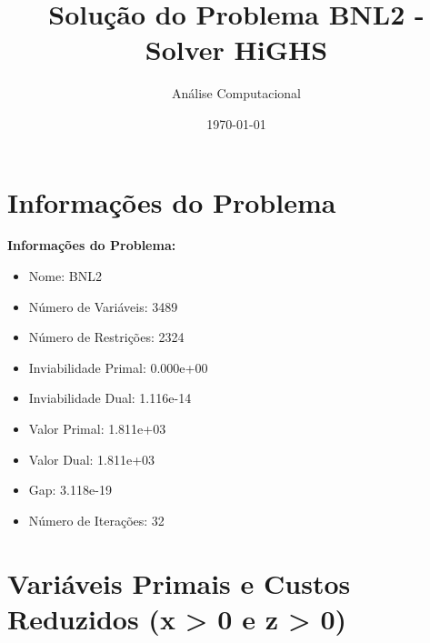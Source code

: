 \documentclass[12pt]{article}
\title{Solução do Problema BNL2 - Solver HiGHS}
\author{Análise Computacional}
\date{\today}
\begin{document}
\maketitle

\section{Informações do Problema}

\textbf{Informações do Problema:}
\begin{itemize}
\item Nome: BNL2
\item Número de Variáveis: 3489
\item Número de Restrições: 2324
\item Inviabilidade Primal: 0.000e+00
\item Inviabilidade Dual: 1.116e-14
\item Valor Primal: 1.811e+03
\item Valor Dual: 1.811e+03
\item Gap: 3.118e-19
\item Número de Iterações: 32
\end{itemize}


\section{Variáveis Primais e Custos Reduzidos (x > 0 e z > 0)}
\end{document}
